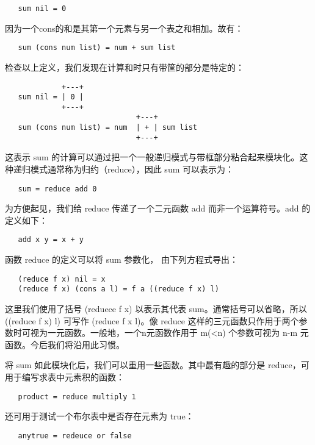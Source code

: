 \documentclass[12pt,a4paper]{article}
\begin{document}
\begin{verbatim}
   sum nil = 0
\end{verbatim}

因为一个cons的和是其第一个元素与另一个表之和相加。故有：

\begin{verbatim}
   sum (cons num list) = num + sum list
\end{verbatim}

检查以上定义，我们发现在计算和时只有带筐的部分是特定的：

\begin{verbatim}
             +---+
   sum nil = | 0 |
             +---+
                              +---+
   sum (cons num list) = num  | + | sum list
                              +---+
\end{verbatim}

这表示 sum 的计算可以通过把一个一般递归模式与带框部分粘合起来模块化。这种递归模式通常称为归约（reduce），因此 sum 可以表示为：

\begin{verbatim}
   sum = reduce add 0
\end{verbatim}

为方便起见，我们给 reduce 传递了一个二元函数 add 而非一个运算符号。add 的定义如下：

\begin{verbatim}
   add x y = x + y
\end{verbatim}

函数 reduce 的定义可以将 sum 参数化， 由下列方程式导出：

\begin{verbatim}
   (reduce f x) nil = x
   (reduce f x) (cons a l) = f a ((reduce f x) l)
\end{verbatim}

这里我们使用了括号 (reduece f x) 以表示其代表 sum。通常括号可以省略，所以 ((reduce f x) l) 可写作 (reduce f x l)。像 reduce 这样的三元函数只作用于两个参数时可视为一元函数。一般地，一个n元函数作用于 m(<n) 个参数可视为 n-m 元函数。今后我们将沿用此习惯。

将 sum 如此模块化后，我们可以重用一些函数。其中最有趣的部分是 reduce，可用于编写求表中元素积的函数：

\begin{verbatim}
   product = reduce multiply 1
\end{verbatim}

还可用于测试一个布尔表中是否存在元素为 true：

\begin{verbatim}
   anytrue = redeuce or false
\end{verbatim}
\end{document}
